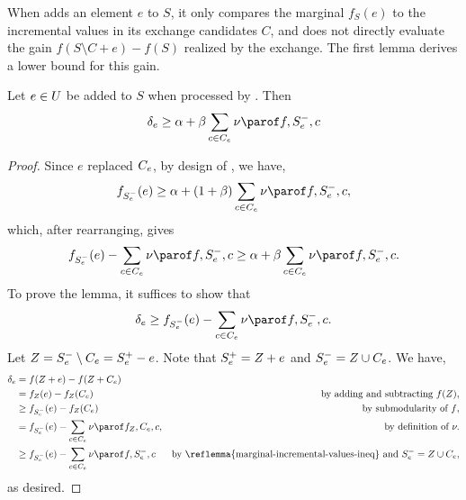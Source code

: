 \documentclass[oneside,letterpaper]{scrartcl} \usepackage{macros}
\begin{document}
When  adds an element $e$ to $S$, it only
compares the marginal $f_S(e)$ to the incremental values in its
exchange candidates $C$, and does not directly evaluate the gain $f(S
\setminus C + e) - f(S)$ realized by the exchange. The first lemma
derives a lower bound for this gain.
\begin{lemma}
  Let $e \in U$ be added to $S$ when processed by
  . Then
  \begin{align*}
    \gainof{e} \geq \alpha + \beta \sum_{c \in \candidatesfor{e}}
    \incvalueof{f}{\setbefore{e}}{c}
  \end{align*}
\end{lemma}
\begin{proof}
  Since $e$ replaced $C_{e}$, by design of
  , we have,
  \begin{align*}
    f_{\setbefore{e}}(e) \geq \alpha + (1+\beta) \sum_{c \in \candidatesfor{e}}
    \incvalueof{f}{\setbefore{e}}{c},
  \end{align*}
  which, after rearranging, gives
  \begin{align*}
    f_{\setbefore{e}}(e) - \sum_{c \in \candidatesfor{e}}
    \incvalueof{f}{\setbefore{e}}{c}\geq \alpha + \beta \sum_{c \in \candidatesfor{e}}
    \incvalueof{f}{\setbefore{e}}{c}.
  \end{align*}
  To prove the lemma, it suffices to show that
  \begin{align*}
    \gainof{e} \geq f_{\setbefore{e}}(e) - \sum_{c \in \candidatesfor{e}}
    \incvalueof{f}{\setbefore{e}}{c}.
  \end{align*}
  Let $Z = S_{e}^- \setminus C_{e} = S_{e}^+ -
  e$. Note that $S_{e}^+ = Z + e$ and $S_{e}^- = Z \cup
  C_{e}$. We have,
  \begin{align*}
    \gainof{e} &= f(Z + e) - f(Z + \candidatesfor{e}) \\
    &= f_Z(e) - f_Z(\candidatesfor{e}) &\text{by adding and
      subtracting } f(Z), \\
    &\geq f_{\setbefore{e}}(e) - f_Z(\candidatesfor{e}) &\text{by
      submodularity of $f$,} \\
    &= f_{\setbefore{e}}(e) - \sum_{c \in \candidatesfor{e}}
    \incvalueof{f_Z}{\candidatesfor{e}}{c}, &\text{by definition of } \incvalue.
    \\
    &\geq f_{\setbefore{e}}(e) - \sum_{c \in
      \candidatesfor{e}}\incvalueof{f}{\setbefore{e}}{c} &\text{by \reflemma{marginal-incremental-values-ineq} and
      $\setbefore{e} = Z\cup C_e$,}
  \end{align*}
  as desired.
\end{proof}
\end{document}

